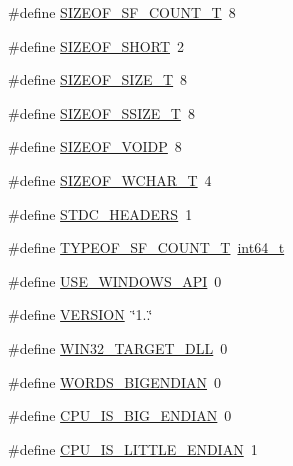 \begin{DoxyCompactItemize}
\item 
\#define \hyperlink{mac_2config_2i386_2lib-src_2libsndfile_2src_2config_8h_ac5d84382a36cbf39d453f08b91cfa014}{S\+I\+Z\+E\+O\+F\+\_\+\+S\+F\+\_\+\+C\+O\+U\+N\+T\+\_\+T}~8
\item 
\#define \hyperlink{mac_2config_2i386_2lib-src_2libsndfile_2src_2config_8h_a391756f658c0bdad5fa65c4cd3410ad6}{S\+I\+Z\+E\+O\+F\+\_\+\+S\+H\+O\+RT}~2
\item 
\#define \hyperlink{mac_2config_2i386_2lib-src_2libsndfile_2src_2config_8h_a8e6961033aca338f7141cd18d6f378c8}{S\+I\+Z\+E\+O\+F\+\_\+\+S\+I\+Z\+E\+\_\+T}~8
\item 
\#define \hyperlink{mac_2config_2i386_2lib-src_2libsndfile_2src_2config_8h_aba66f36200c811d011907013d0f3ca24}{S\+I\+Z\+E\+O\+F\+\_\+\+S\+S\+I\+Z\+E\+\_\+T}~8
\item 
\#define \hyperlink{mac_2config_2i386_2lib-src_2libsndfile_2src_2config_8h_a8bcdbb0550d2cf79483efdfb3fe9013f}{S\+I\+Z\+E\+O\+F\+\_\+\+V\+O\+I\+DP}~8
\item 
\#define \hyperlink{mac_2config_2i386_2lib-src_2libsndfile_2src_2config_8h_a4ab7aafe170715cce87d8ec569903a80}{S\+I\+Z\+E\+O\+F\+\_\+\+W\+C\+H\+A\+R\+\_\+T}~4
\item 
\#define \hyperlink{mac_2config_2i386_2lib-src_2libsndfile_2src_2config_8h_a550e5c272cc3cf3814651721167dcd23}{S\+T\+D\+C\+\_\+\+H\+E\+A\+D\+E\+RS}~1
\item 
\#define \hyperlink{mac_2config_2i386_2lib-src_2libsndfile_2src_2config_8h_a283754dfd7b519c2a14019efbc71f215}{T\+Y\+P\+E\+O\+F\+\_\+\+S\+F\+\_\+\+C\+O\+U\+N\+T\+\_\+T}~\hyperlink{lib-src_2ffmpeg_2win32_2stdint_8h_a67a9885ef4908cb72ce26d75b694386c}{int64\+\_\+t}
\item 
\#define \hyperlink{mac_2config_2i386_2lib-src_2libsndfile_2src_2config_8h_a45199f0f01804a6279087e339050b77a}{U\+S\+E\+\_\+\+W\+I\+N\+D\+O\+W\+S\+\_\+\+A\+PI}~0
\item 
\#define \hyperlink{mac_2config_2i386_2lib-src_2libsndfile_2src_2config_8h_a1c6d5de492ac61ad29aec7aa9a436bbf}{V\+E\+R\+S\+I\+ON}~\char`\"{}1..\char`\"{}
\item 
\#define \hyperlink{mac_2config_2i386_2lib-src_2libsndfile_2src_2config_8h_ac7596528ea5bc0b5631256a5aa3f87c9}{W\+I\+N32\+\_\+\+T\+A\+R\+G\+E\+T\+\_\+\+D\+LL}~0
\item 
\#define \hyperlink{mac_2config_2i386_2lib-src_2libsndfile_2src_2config_8h_a82e69009d3cd108c8aad8afe44fb1132}{W\+O\+R\+D\+S\+\_\+\+B\+I\+G\+E\+N\+D\+I\+AN}~0
\item 
\#define \hyperlink{mac_2config_2i386_2lib-src_2libsndfile_2src_2config_8h_ab94a8b6379b0158c73f193e351a06c47}{C\+P\+U\+\_\+\+I\+S\+\_\+\+B\+I\+G\+\_\+\+E\+N\+D\+I\+AN}~0
\item 
\#define \hyperlink{mac_2config_2i386_2lib-src_2libsndfile_2src_2config_8h_aab66c42b3a2cd5691035648eebd7e092}{C\+P\+U\+\_\+\+I\+S\+\_\+\+L\+I\+T\+T\+L\+E\+\_\+\+E\+N\+D\+I\+AN}~1
\end{DoxyCompactItemize}



